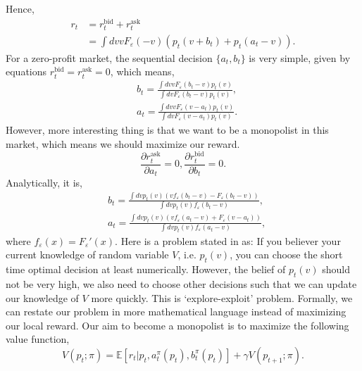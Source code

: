 \documentclass[11pt,a4paper]{article}
\def\epsilon{\varepsilon}
\def\E{\mathbb{E}}
\begin{document}
Hence,
\begin{align}
r_t & = r_t^{\mathrm{bid}} + r_t^{\mathrm{ask}} \\ 
& = \int dv v F_{\epsilon}(-v)(p_t(v+b_t)+p_t(a_t-v)).
\end{align}
For a zero-profit market, the sequential decision $\{a_t,b_t\}$ is very simple, given by equations $r_t^{\mathrm{bid}} = r_t^{\mathrm{ask}} = 0$, which means,
\begin{align}
& b_t = \frac{\int dv v F_{\epsilon}(b_t-v)p_t(v)}{\int dv F_{\epsilon}(b_t -v)p_t(v)}, \\ 
& a_t = \frac{\int dv v F_{\epsilon}(v-a_t)p_t(v)}{\int dv F_{\epsilon}(v-a_t)p_t(v)}.
\end{align}
However, more interesting thing is that we want to be a monopolist in this market, which means we should maximize our reward.
\begin{equation}
\frac{\partial r_t^{\mathrm{ask}}}{\partial a_t} = 0, \frac{\partial r_t^{\mathrm{bid}}}{\partial b_t} = 0.
\end{equation}
Analytically, it is,
\begin{align}
& b_t = \frac{\int dv p_t(v)(vf_{\epsilon}(b_t-v)-F_{\epsilon}(b_t-v))}{\int dv p_t(v)f_{\epsilon}(b_t-v)}, \\ 
& a_t = \frac{\int dv p_t(v)(vf_{\epsilon}(a_t-v)+F_{\epsilon}(v-a_t))}{\int dv p_t(v)f_{\epsilon}(a_t-v)},
\end{align}
where $f_{\epsilon}(x) = F_{\epsilon}'(x)$. Here is a problem stated in as: If you believer your current knowledge of random variable $V$, i.e. $p_t(v)$, you can choose the short time optimal decision at least numerically. However, the belief of $p_t(v)$ should not be very high, we also need to choose other decisions such that we can update our knowledge of $V$ more quickly. This is `explore-exploit' problem. Formally, we can restate our problem in more mathematical language instead of maximizing our local reward. Our aim to become a monopolist is to maximize the following value function,
\begin{equation}
V(p_t;\pi) = \E[r_t|p_t,a_t^{\pi}(p_t),b_t^{\pi}(p_t)] + \gamma V(p_{t+1};\pi). 
\end{equation}
\end{document}
